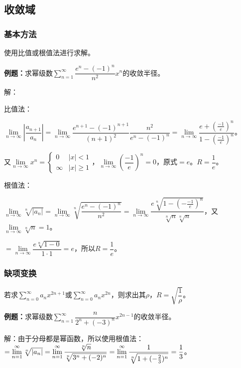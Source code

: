 \subsection{收敛域}

\subsubsection{基本方法}

使用比值或根值法进行求解。

\textbf{例题：}求幂级数$\sum\limits_{n=1}^\infty\dfrac{e^n-(-1)^n}{n^2}x^n$的收敛半径。

解：

比值法：

$\lim\limits_{n\to\infty}\left\vert\dfrac{a_{n+1}}{a_n}\right\vert=\lim\limits_{n\to\infty}\dfrac{e^{n+1}-(-1)^{n+1}}{(n+1)^2}\dfrac{n^2}{e^n-(-1)^n}=\lim\limits_{n\to\infty}\dfrac{e+(\frac{-1}{e})^n}{1-(\frac{-1}{e})^n}$。

又$\lim\limits_{n\to\infty}x^n=\left\{\begin{array}{ll}
    0 & \vert x\vert<1 \\
    \infty & \vert x\vert\geqslant1
\end{array}\right.$，$\lim\limits_{n\to\infty}\left(\dfrac{-1}{e}\right)^n=0$，原式$=e$。$R=\dfrac{1}{e}$。

根值法：

$\lim\limits_{n\to\infty}\sqrt[n]{\vert a_n\vert}=\lim\limits_{n\to\infty}\sqrt[n]{\dfrac{e^n-(-1)^n}{n^2}}=\lim\limits_{n\to\infty}\dfrac{e\sqrt[n]{1-(-\frac{-1}{e})^n}}{\sqrt[n]{n}\sqrt[n]{n}}$，又$\lim\limits_{n\to\infty}\sqrt[n]{n}=1$。

$=\lim\limits_{n\to\infty}\dfrac{e\sqrt[n]{1-0}}{1\cdot1}=e$，所以$R=\dfrac{1}{e}$。

\subsubsection{缺项变换}

若求$\sum\limits_{n=0}^\infty a_nx^{2n+1}$或$\sum\limits_{n=0}^\infty a_nx^{2n}$，则求出其$\rho$，$R=\sqrt{\dfrac{1}{\rho}}$。

\textbf{例题：}求幂级数$\sum\limits_{n=1}^\infty\dfrac{n}{2^n+(-3)^n}x^{2n-1}$的收敛半径。

解：由于分母都是幂函数，所以使用根值法：$=\lim\limits_{n=1}^\infty\sqrt[n]{\vert a_n\vert}=\lim\limits_{n=1}^\infty\dfrac{\sqrt[n]{n}}{\sqrt[n]{3^n+(-2)^n}}\\=\lim\limits_{n=1}^\infty\dfrac{1}{\sqrt[n]{1+(-\frac{2}{3})^n}}=\dfrac{1}{3}$。

